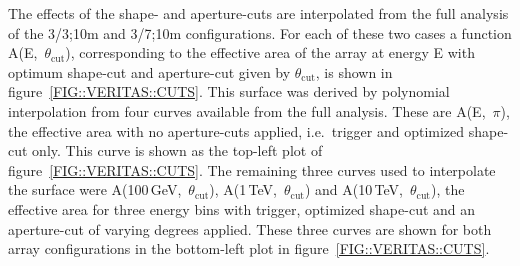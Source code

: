 The effects of the shape- and aperture-cuts are interpolated from the
full analysis of the 3/3;10m and 3/7;10m configurations. For each of
these two cases a function A(E,~$\theta_\mathrm{cut}$), corresponding
to the effective area of the array at energy E with optimum shape-cut
and aperture-cut given by $\theta_\mathrm{cut}$, is shown in
figure~\ref{FIG::VERITAS::CUTS}. This surface was derived by
polynomial interpolation from four curves available from the full
analysis. These are A(E,~$\pi$), the effective area with no
aperture-cuts applied, i.e.\ trigger and optimized shape-cut
only. This curve is shown as the top-left plot of
figure~\ref{FIG::VERITAS::CUTS}. The remaining three curves used to
interpolate the surface were A(100\,GeV,~$\theta_\mathrm{cut}$),
A(1\,TeV,~$\theta_\mathrm{cut}$) and
A(10\,TeV,~$\theta_\mathrm{cut}$), the effective area for three energy
bins with trigger, optimized shape-cut and an aperture-cut of varying
degrees applied. These three curves are shown for both array
configurations in the bottom-left plot in
figure~\ref{FIG::VERITAS::CUTS}.

